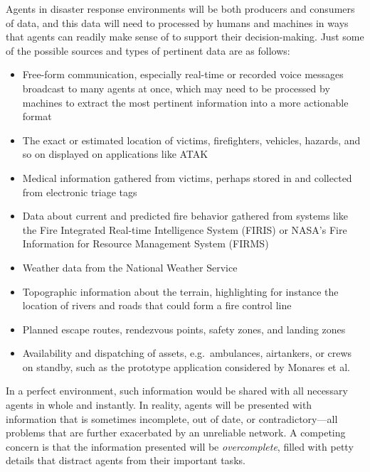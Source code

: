 \documentclass[]             %
{NASA}                       %
\theoremstyle{definition}
\begin{document}
Agents in disaster response environments will be both producers and
consumers of data, and this data will need to processed by humans and
machines in ways that agents can readily make sense of to support
their decision-making. Just some of the possible sources and types of
pertinent data are as follows:
\begin{itemize}
\item Free-form communication, especially real-time or recorded voice messages
  broadcast to many agents at once, which may need to be processed by
  machines to extract the most pertinent information into a more
  actionable format
\item The exact or estimated location of victims, firefighters,
  vehicles, hazards, and so on displayed on applications like ATAK
\item Medical information gathered from victims, perhaps stored in and
  collected from electronic triage tags \cite{2009:triagetag}
\item Data about current and predicted fire behavior gathered from
  systems like the Fire Integrated Real-time Intelligence System
  (FIRIS) or NASA's Fire Information for Resource Management System
  (FIRMS)
\item Weather data from the National Weather Service
\item Topographic information about the terrain, highlighting for
  instance the location of rivers and roads that could form a fire
  control line
\item Planned escape routes, rendezvous points, safety zones, and
  landing zones
\item Availability and dispatching of assets, e.g.~ambulances,
  airtankers, or crews on standby, such as the prototype application
  considered by Monares et al. \cite{2011:monares}
\end{itemize}
In a perfect environment, such information would be shared with all
necessary agents in whole and instantly. In reality, agents will be
presented with information that is sometimes incomplete, out of date,
or contradictory---all problems that are further exacerbated by an
unreliable network. A competing concern is that the information
presented will be \emph{overcomplete}, filled with petty details that
distract agents from their important tasks.
\end{document}
